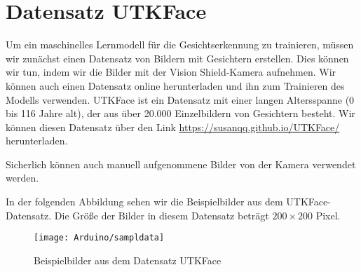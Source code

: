 %
%




\section{Datensatz UTKFace}\label{UTKFace}


Um ein maschinelles Lernmodell für die Gesichtserkennung zu trainieren, müssen wir zunächst einen Datensatz von Bildern mit Gesichtern erstellen.  Dies können wir tun, indem wir die Bilder mit der Vision Shield-Kamera aufnehmen. Wir können auch einen Datensatz online herunterladen und ihn zum Trainieren des Modells verwenden.  UTKFace ist ein Datensatz mit einer langen Altersspanne (0 bis 116 Jahre alt), der aus über 20.000 Einzelbildern von Gesichtern besteht. Wir können diesen Datensatz über den Link \url{https://susanqq.github.io/UTKFace/} herunterladen.

Sicherlich können auch  manuell aufgenommene Bilder von der Kamera verwendet werden.


In der folgenden Abbildung sehen wir die Beispielbilder aus dem UTKFace-Datensatz. Die Größe der Bilder in diesem Datensatz beträgt $200\times 200$ Pixel. 

\begin{figure}[H]
	\centering
	\texttt{[image: Arduino/sampldata]}
	\caption{Beispielbilder aus dem Datensatz UTKFace
		  }
	\label{UTKFace}
\end{figure}



